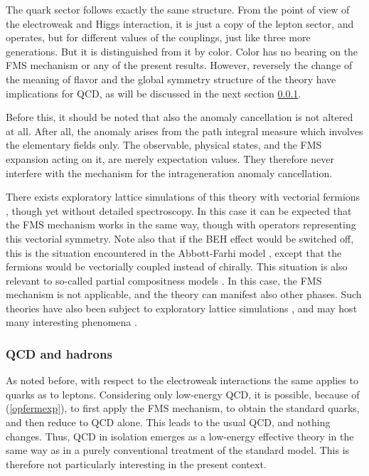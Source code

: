 \documentclass[final,12pt]{article}
\newcommand*{\pref}[1]{(\ref{#1})}
\newcommand*{\1}{1\!\!\!\bot}
\begin{document}
The quark sector follows exactly the same structure. From the point of view of the electroweak and Higgs interaction, it is just a copy of the lepton sector, and operates, but for different values of the couplings, just like three more generations. But it is distinguished from it by color. Color has no bearing on the FMS mechanism or any of the present results. However, reversely the change of the meaning of flavor and the global symmetry structure of the theory have implications for QCD, as will be discussed in the next section \ref{ss:qcd}.

Before this, it should be noted that also the anomaly cancellation is not altered at all. After all, the anomaly arises from the path integral measure \cite{Bohm:2001yx,Bertlmann:1996xk} which involves the elementary fields only. The observable, physical states, and the FMS expansion acting on it, are merely expectation values. They therefore never interfere with the mechanism for the intrageneration anomaly cancellation.

There exists exploratory lattice simulations of this theory with vectorial fermions \cite{Lee:1987zu,Aoki:1988aw}, though yet without detailed spectroscopy. In this case it can be expected that the FMS mechanism works in the same way, though with operators representing this vectorial symmetry. Note also that if the BEH effect would be switched off, this is the situation encountered in the Abbott-Farhi model \cite{Abbott:1981re}, except that the fermions would be vectorially coupled instead of chirally. This situation is also relevant to so-called partial compositness models \cite{Kaplan:1991dc,Sannino:2016sfx}. In this case, the FMS mechanism is not applicable, and the theory can manifest also other phases. Such theories have also been subject to exploratory lattice simulations \cite{Lee:1987zu,Aoki:1988aw,Aoki:1988fg,Hansen:2017mrt}, and may host many interesting phenomena \cite{Lee:1988ut,Hsu:1993zc}.

\subsubsection{QCD and hadrons}\label{ss:qcd}

As noted before, with respect to the electroweak interactions the same applies to quarks as to leptons. Considering only low-energy QCD, it is possible, because of \pref{opfermexp}, to first apply the FMS mechanism, to obtain the standard quarks, and then reduce to QCD alone. This leads to the usual QCD, and nothing changes. Thus, QCD in isolation emerges as a low-energy effective theory in the same way as in a purely conventional treatment of the standard model. This is therefore not particularly interesting in the present context.
\end{document}

